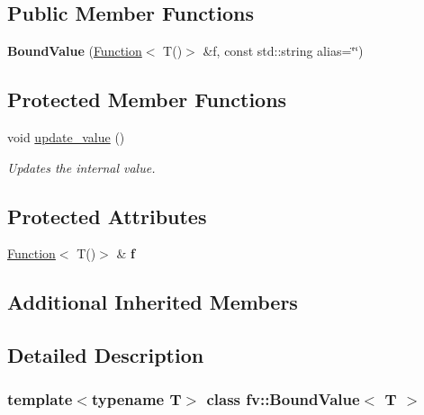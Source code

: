 \subsection*{Public Member Functions}
\begin{DoxyCompactItemize}
\item 
\hypertarget{classfv_1_1BoundValue_aa5157e0e9ba817cdeaef72f643ba8a79}{}\label{classfv_1_1BoundValue_aa5157e0e9ba817cdeaef72f643ba8a79} 
{\bfseries Bound\+Value} (\hyperlink{classfv_1_1Function}{Function}$<$ T()$>$ \&f, const std\+::string alias=\char`\"{}\char`\"{})
\end{DoxyCompactItemize}
\subsection*{Protected Member Functions}
\begin{DoxyCompactItemize}
\item 
void \hyperlink{classfv_1_1BoundValue_a51ba914f1eac694af4264d62785282a1}{update\+\_\+value} ()
\begin{DoxyCompactList}\small\item\em Updates the internal value. \end{DoxyCompactList}\end{DoxyCompactItemize}
\subsection*{Protected Attributes}
\begin{DoxyCompactItemize}
\item 
\hypertarget{classfv_1_1BoundValue_a09946c7cd867603db1b66d64a6d43e69}{}\label{classfv_1_1BoundValue_a09946c7cd867603db1b66d64a6d43e69} 
\hyperlink{classfv_1_1Function}{Function}$<$ T()$>$ \& {\bfseries f}
\end{DoxyCompactItemize}
\subsection*{Additional Inherited Members}


\subsection{Detailed Description}
\subsubsection*{template$<$typename T$>$\newline
class fv\+::\+Bound\+Value$<$ T $>$}

